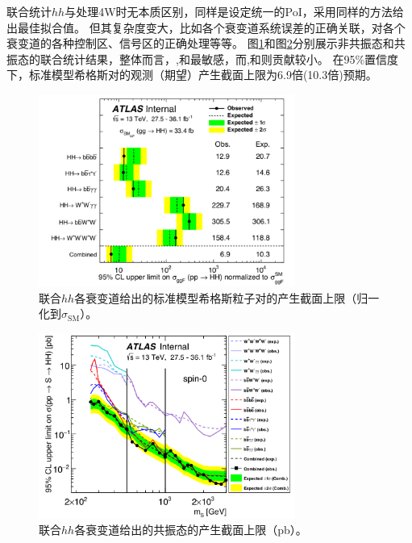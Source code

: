 联合统计$hh$与处理4W时无本质区别，同样是设定统一的PoI，采用同样的方法给出最佳拟合值。
但其复杂度变大，比如各个衰变道系统误差的正确关联，对各个衰变道的各种控制区、信号区的正确处理等等。
图\ref{fig:HH_combined_nonres}和图\ref{fig:HH_combined_res}分别展示非共振态和共振态的联合统计结果，整体而言，\bbbb ,\bbtt 和\bbaa 最敏感，而\wwaa ,\bbww 和\wwww 则贡献较小。
在95\%置信度下，标准模型希格斯对的观测（期望）产生截面上限为6.9倍(10.3倍)预期。
\begin{figure}[h]
\centering
 \includegraphics[width=0.75\textwidth]{fig/HH_combined_nonres.png}
 \caption{联合$hh$各衰变道给出的标准模型希格斯粒子对的产生截面上限（归一化到$\sigma_{\text{SM}}$）。}
 \label{fig:HH_combined_nonres}
\end{figure}

\begin{figure}[h]
\centering
 \includegraphics[width=0.75\textwidth]{fig/HH_combined_res.png}
 \caption{联合$hh$各衰变道给出的共振态的产生截面上限（pb）。}
 \label{fig:HH_combined_res}
\end{figure}

